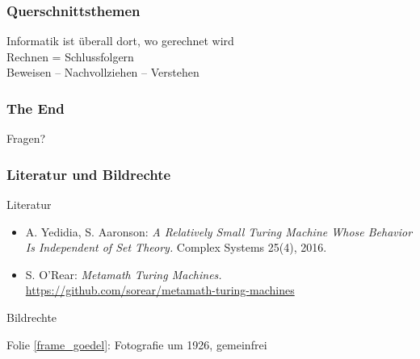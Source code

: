 \documentclass[aspectratio=1610,onlymath]{beamer}
\begin{document}
\begin{frame}\frametitle{Querschnittsthemen}

\begin{center}
\large

Informatik ist überall dort, wo gerechnet wird\pause\\[4ex]

Rechnen = Schlussfolgern\pause\\[4ex]

Beweisen -- Nachvollziehen -- Verstehen\\[4ex]

\end{center}

\end{frame}


\begin{frame}\frametitle{The End}

\bigskip
\begin{center}
{\Huge Fragen?}
\end{center}
\bigskip\bigskip


\end{frame}


\begin{frame}[t]\frametitle{Literatur und Bildrechte}

\alert{Literatur}\bigskip

\begin{itemize}
\item A. Yedidia, S. Aaronson: \emph{A Relatively Small Turing Machine Whose Behavior Is Independent of Set Theory.} Complex Systems 25(4), 2016.
\item S. O'Rear: \emph{Metamath Turing Machines.} \url{https://github.com/sorear/metamath-turing-machines}
\end{itemize}

\alert{Bildrechte}\bigskip

Folie \ref{frame_goedel}: Fotografie um 1926, gemeinfrei

\end{frame}
\end{document}
